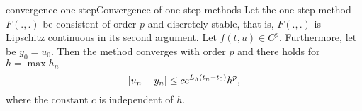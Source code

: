 \begin{Theorem*}{convergence-one-step}{Convergence of one-step methods}
  Let the one-step method $F(.,.)$ be consistent of order $p$ and
  discretely stable, that is, $F(.,.)$ is Lipschitz continuous in its
  second argument. Let $f(t,u)\in C^{p}$. Furthermore, let be
  $y_0 = u_0$. Then the method converges with order $p$ and there
  holds for $h = \max h_n$
  \begin{equation}
    \label{eq:convergence-onestep:1}
    \lvert u_n - y_n\rvert \le c e^{L_h(t_n-t_0)} h^p,
  \end{equation}
  where the constant $c$ is independent of $h$.
\end{Theorem*}

